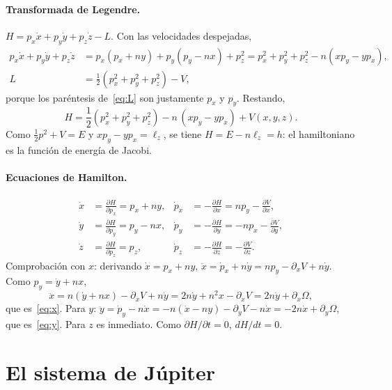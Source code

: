 \documentclass[12pt,letterpaper]{article}
\begin{document}
\paragraph{Transformada de Legendre.} $H = p_x\dot x + p_y\dot y + p_z\dot z - L$. Con las
velocidades despejadas,
\begin{align*}
p_x\dot x + p_y\dot y + p_z\dot z &= p_x(p_x + n y) + p_y(p_y - n x) + p_z^2
= p_x^2 + p_y^2 + p_z^2 - n(x p_y - y p_x),\\
L &= \tfrac12\left(p_x^2 + p_y^2 + p_z^2\right) - V,
\end{align*}
porque los paréntesis de~\eqref{eq:L} son justamente $p_x$ y $p_y$. Restando,
\begin{equation}
H = \frac12\left(p_x^2+p_y^2+p_z^2\right) - n\,(x p_y - y p_x) + V(x,y,z).
\label{eq:H}
\end{equation}
Como $\tfrac12 p^2 + V = E$ y $x p_y - y p_x = \ell_z$, se tiene $H = E - n\ell_z = h$: el
hamiltoniano es la función de energía de Jacobi.

\paragraph{Ecuaciones de Hamilton.}
\begin{align*}
\dot x &= \frac{\partial H}{\partial p_x} = p_x + n y, &
\dot p_x &= -\frac{\partial H}{\partial x} = n p_y - \frac{\partial V}{\partial x},\\
\dot y &= \frac{\partial H}{\partial p_y} = p_y - n x, &
\dot p_y &= -\frac{\partial H}{\partial y} = -n p_x - \frac{\partial V}{\partial y},\\
\dot z &= \frac{\partial H}{\partial p_z} = p_z, &
\dot p_z &= -\frac{\partial H}{\partial z} = - \frac{\partial V}{\partial z}.
\end{align*}
Comprobación con $x$: derivando $\dot x = p_x + n y$,
$\ddot x = \dot p_x + n\dot y = n p_y - \partial_x V + n\dot y$. Como $p_y = \dot y + n x$,
\[
\ddot x = n(\dot y + n x) - \partial_x V + n\dot y = 2n\dot y + n^2 x - \partial_x V
= 2n\dot y + \partial_x\Omega,
\]
que es~\eqref{eq:x}. Para $y$: $\ddot y = \dot p_y - n\dot x = -n(\dot x - ny) - \partial_y V - n\dot x
= -2n\dot x + \partial_y\Omega$, que es~\eqref{eq:y}. Para $z$ es inmediato. Como
$\partial H/\partial t = 0$, $dH/dt = 0$.

\section{El sistema de Júpiter}
\end{document}
